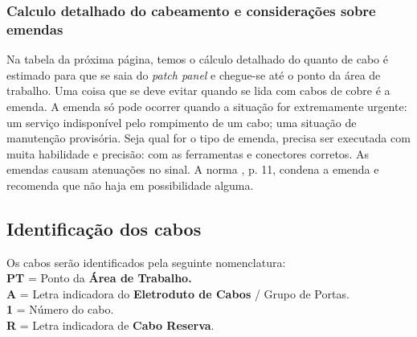 \documentclass[	DIV=calc,%
							paper=a4,%
							fontsize=12pt,%
							onecolumn]{scrartcl}	 					%
\begin{document}




\subsubsection{Calculo detalhado do cabeamento e considerações sobre emendas}

Na tabela da próxima página, temos o cálculo detalhado do quanto de cabo é estimado para que se saia do \textit{patch panel} e chegue-se até o ponto da área de trabalho. Uma coisa que se deve evitar quando se lida com cabos de cobre é a emenda. A emenda só pode ocorrer quando a situação for extremamente urgente: um serviço indisponível pelo rompimento de um cabo; uma situação de manutenção provisória. Seja qual for o tipo de emenda, precisa ser executada com muita habilidade e precisão: com as ferramentas e conectores corretos. As emendas causam atenuações no sinal. A norma \cite{abnt14565}, p. 11, condena a emenda e recomenda que não haja em possibilidade alguma.




\clearpage
\thispagestyle{plain}

\recalctypearea

{\centering

}

\clearpage
{}
\recalctypearea

\subsection{Identificação dos cabos}

Os cabos serão identificados pela seguinte nomenclatura:
\\

\textbf{PT} = Ponto da \textbf{Área de Trabalho.}
\\

\textbf{A} = Letra indicadora do \textbf{Eletroduto de Cabos} / Grupo de Portas.
\\

\textbf{1} = Número do cabo.
\\

\textbf{R} = Letra indicadora de \textbf{Cabo Reserva}.
\\
\end{document}
